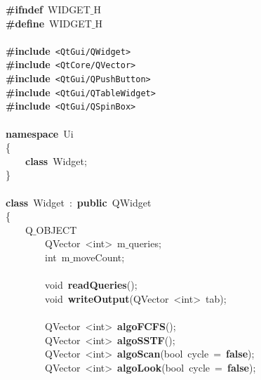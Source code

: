 \noindent
\mbox{}\textbf{\#ifndef}\ WIDGET$\_$H \\
\mbox{}\textbf{\#define}\ WIDGET$\_$H \\
\mbox{} \\
\mbox{}\textbf{\#include}\ \texttt{\textless{}QtGui/QWidget\textgreater{}} \\
\mbox{}\textbf{\#include}\ \texttt{\textless{}QtCore/QVector\textgreater{}} \\
\mbox{}\textbf{\#include}\ \texttt{\textless{}QtGui/QPushButton\textgreater{}} \\
\mbox{}\textbf{\#include}\ \texttt{\textless{}QtGui/QTableWidget\textgreater{}} \\
\mbox{}\textbf{\#include}\ \texttt{\textless{}QtGui/QSpinBox\textgreater{}} \\
\mbox{} \\
\mbox{}\textbf{namespace}\ Ui \\
\mbox{}\{ \\
\mbox{}\ \ \ \ \textbf{class}\ Widget; \\
\mbox{}\} \\
\mbox{} \\
\mbox{}\textbf{class}\ Widget\ :\ \textbf{public}\ QWidget \\
\mbox{}\{ \\
\mbox{}\ \ \ \ Q$\_$OBJECT \\
\mbox{}\ \ \ \ \ \ \ \ QVector\ \textless{}int\textgreater{}\ m$\_$queries; \\
\mbox{}\ \ \ \ \ \ \ \ int\ m$\_$moveCount; \\
\mbox{} \\
\mbox{}\ \ \ \ \ \ \ \ void\ \textbf{readQueries}(); \\
\mbox{}\ \ \ \ \ \ \ \ void\ \textbf{writeOutput}(QVector\ \textless{}int\textgreater{}\ tab); \\
\mbox{} \\
\mbox{}\ \ \ \ \ \ \ \ QVector\ \textless{}int\textgreater{}\ \textbf{algoFCFS}(); \\
\mbox{}\ \ \ \ \ \ \ \ QVector\ \textless{}int\textgreater{}\ \textbf{algoSSTF}(); \\
\mbox{}\ \ \ \ \ \ \ \ QVector\ \textless{}int\textgreater{}\ \textbf{algoScan}(bool\ cycle\ =\ \textbf{false}); \\
\mbox{}\ \ \ \ \ \ \ \ QVector\ \textless{}int\textgreater{}\ \textbf{algoLook}(bool\ cycle\ =\ \textbf{false}); \\

